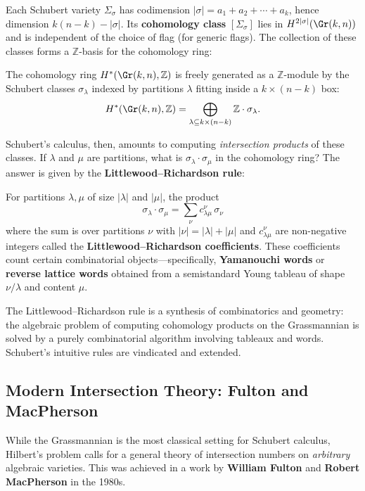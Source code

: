 Each Schubert variety $\Sigma_\sigma$ has codimension $|\sigma| = a_1 + a_2 + \cdots + a_k$, hence dimension $k(n-k)-|\sigma|$. Its \textbf{cohomology class} $[\Sigma_\sigma]$ lies in $H^{2|\sigma|}(\Gr(k,n))$ and is independent of the choice of flag (for generic flags). The collection of these classes forms a $\mathbb{Z}$-basis for the cohomology ring:

\begin{theorem}\label{thm:schubert-basis}
The cohomology ring $H^*(\Gr(k,n), \mathbb{Z})$ is freely generated as a $\mathbb{Z}$-module by the Schubert classes $\sigma_\lambda$ indexed by partitions $\lambda$ fitting inside a $k \times (n-k)$ box:
\[
    H^*(\Gr(k,n), \mathbb{Z}) = \bigoplus_{\lambda \subseteq k \times (n-k)} \mathbb{Z} \cdot \sigma_\lambda.
\]
\end{theorem}

Schubert's calculus, then, amounts to computing \emph{intersection products} of these classes. If $\lambda$ and $\mu$ are partitions, what is $\sigma_\lambda \cdot \sigma_\mu$ in the cohomology ring? The answer is given by the \textbf{Littlewood--Richardson rule}:

\begin{theorem}\label{thm:littlewood-richardson}
For partitions $\lambda, \mu$ of size $|\lambda|$ and $|\mu|$, the product
\[
    \sigma_\lambda \cdot \sigma_\mu = \sum_{\nu} c_{\lambda\mu}^{\nu} \, \sigma_\nu
\]
where the sum is over partitions $\nu$ with $|\nu| = |\lambda| + |\mu|$ and $c_{\lambda\mu}^{\nu}$ are non-negative integers called the \textbf{Littlewood--Richardson coefficients}. These coefficients count certain combinatorial objects---specifically, \textbf{Yamanouchi words} or \textbf{reverse lattice words} obtained from a semistandard Young tableau of shape $\nu / \lambda$ and content $\mu$.
\end{theorem}

The Littlewood--Richardson rule is a synthesis of combinatorics and geometry: the algebraic problem of computing cohomology products on the Grassmannian is solved by a purely combinatorial algorithm involving tableaux and words. Schubert's intuitive rules are vindicated and extended.

\subsection{Modern Intersection Theory: Fulton and MacPherson}

While the Grassmannian is the most classical setting for Schubert calculus, Hilbert's problem calls for a general theory of intersection numbers on \emph{arbitrary} algebraic varieties. This was achieved in a work by \textbf{William Fulton} and \textbf{Robert MacPherson} in the 1980s.

